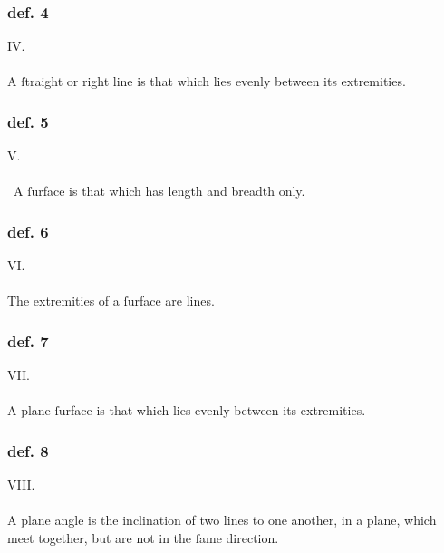 \begin{minipage}{0.67\textwidth}
    \subsubsection{def. 4}
    \begin{center}
        IV.\label{book1def4}\\
        \hfill\\
        A ſtraight or right line is that which lies evenly between its \mbox{extremities}.
    \end{center}
    \subsubsection{def. 5}
    \begin{center}
        V.\label{book1def5}\\
        \hfill\\\
        A ſurface is that which has length and breadth only.\\
    \end{center}
    \subsubsection{def. 6}
    \begin{center}
        VI.\label{book1def6}\\
        \hfill\\
        The extremities of a ſurface are lines.\\
    \end{center}
\end{minipage}

\hfill

\begin{minipage}{0.67\textwidth}
    \subsubsection{def. 7}
    \begin{center}
        VII.\label{book1def7}\\
        \hfill\\
        A plane ſurface is that which lies evenly between its extremities.\\
    \end{center}
    \subsubsection{def. 8}
    \begin{center}
        VIII.\label{book1def8}\\
        \hfill\\
        A plane angle is the inclination of two lines to one another, in a plane, which meet together, but are not in the ſame direction.
    \end{center}
\end{minipage}%
\begin{minipage}{0.33\textwidth}
    \phantom{}
\end{minipage}

